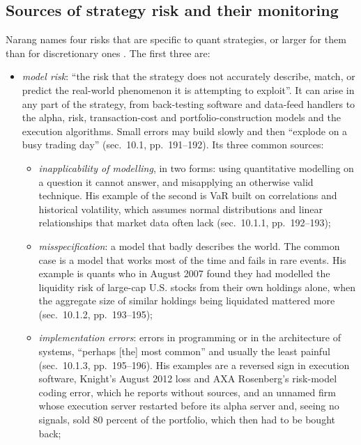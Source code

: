 \subsection{Sources of strategy risk and their monitoring}

\begin{qfdefinition}\label{def:quant-strategy-risk-sources}
 Narang names four risks that are specific to quant strategies, or larger for them than for discretionary ones \citep[chap.~``Risks Inherent to Quant Strategies'', secs.~10.1--10.4 and~10.6, pp.~191--211]{s7-narang}. The first three are:
\begin{itemize}
\item \emph{model risk}: ``the risk that the strategy does not accurately describe, match, or predict the real-world phenomenon it is attempting to exploit''. It can arise in any part of the strategy, from back-testing software and data-feed handlers to the alpha, risk, transaction-cost and portfolio-construction models and the execution algorithms. Small errors may build slowly and then ``explode on a busy trading day'' (sec.~10.1, pp.~191--192). Its three common sources:
  \begin{itemize}
  \item \emph{inapplicability of modelling}, in two forms: using quantitative modelling on a question it cannot answer, and misapplying an otherwise valid technique. His example of the second is VaR built on correlations and historical volatility, which assumes normal distributions and linear relationships that market data often lack (sec.~10.1.1, pp.~192--193);
  \item \emph{misspecification}: a model that badly describes the world. The common case is a model that works most of the time and fails in rare events. His example is quants who in August 2007 found they had modelled the liquidity risk of large-cap U.S. stocks from their own holdings alone, when the aggregate size of similar holdings being liquidated mattered more (sec.~10.1.2, pp.~193--195);
  \item \emph{implementation errors}: errors in programming or in the architecture of systems, ``perhaps [the] most common'' and usually the least painful (sec.~10.1.3, pp.~195--196). His examples are a reversed sign in execution software, Knight's August 2012 loss and AXA Rosenberg's risk-model coding error, which he reports without sources, and an unnamed firm whose execution server restarted before its alpha server and, seeing no signals, sold 80 percent of the portfolio, which then had to be bought back;

\end{itemize}
\end{itemize}
\end{qfdefinition}
